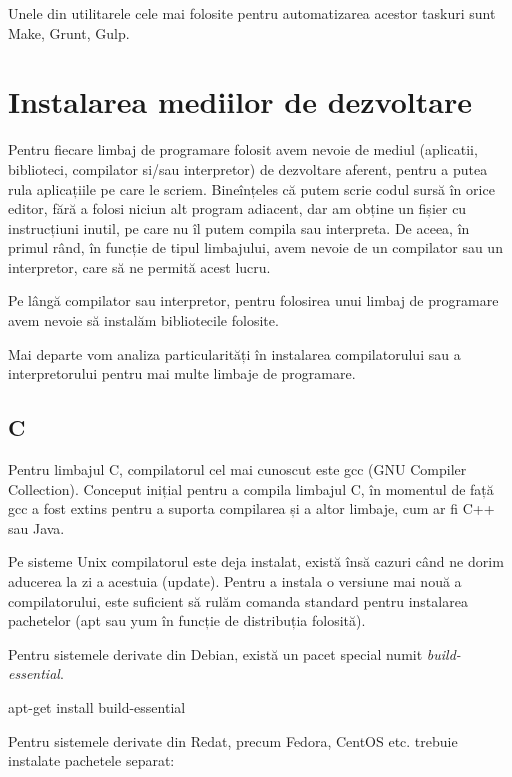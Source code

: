 Unele din utilitarele cele mai folosite pentru automatizarea acestor taskuri
sunt Make, Grunt, Gulp.

\section{Instalarea mediilor de dezvoltare}
\label{sec:appdev-ideinstall}

Pentru fiecare limbaj de programare folosit avem nevoie de mediul (aplicatii,
biblioteci, compilator si/sau interpretor) de dezvoltare aferent, pentru a putea
rula aplicațiile pe care le scriem. Bineînțeles că putem scrie codul sursă în
orice editor, fără a folosi niciun alt program adiacent, dar am obține un fișier
cu instrucțiuni inutil, pe care nu îl putem compila sau interpreta. De aceea, în
primul rând, în funcție de tipul limbajului, avem nevoie de un compilator sau un
interpretor, care să ne permită acest lucru.

Pe lângă compilator sau interpretor, pentru folosirea unui limbaj de programare
avem nevoie să instalăm bibliotecile folosite.

Mai departe vom analiza particularități în instalarea compilatorului sau a
interpretorului pentru mai multe limbaje de programare.

\subsection{C}
\label{sec:appdev-ideinstall-c}

Pentru limbajul C, compilatorul cel mai cunoscut este gcc  (GNU Compiler Collection). Conceput inițial pentru a
compila limbajul C, în momentul de față gcc a fost extins pentru a suporta
compilarea și a altor limbaje, cum ar fi C++ sau Java.

Pe sisteme Unix compilatorul este deja instalat, există însă cazuri când ne
dorim aducerea la zi a acestuia (update). Pentru a instala o versiune mai nouă a
compilatorului, este suficient să rulăm comanda standard pentru instalarea
pachetelor (apt sau yum în funcție de distribuția folosită).

Pentru sistemele derivate din Debian, există un pacet special numit
\textit{build-essential}.

\begin{screen}
apt-get install build-essential
\end{screen}

Pentru sistemele derivate din Redat, precum Fedora, CentOS etc. trebuie
instalate pachetele separat:

